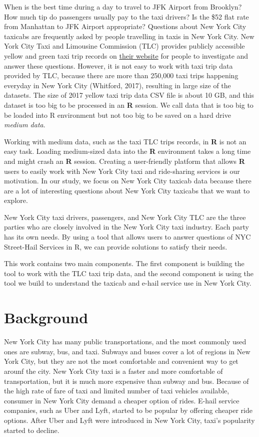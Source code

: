 \documentclass[12pt,twoside]{reedthesis}
\theoremstyle{definition}
\theoremstyle{definition}
\theoremstyle{definition}
\theoremstyle{remark}
\begin{document}
When is the best time during a day to travel to JFK Airport from
Brooklyn? How much tip do passengers usually pay to the taxi drivers? Is
the \$52 flat rate from Manhattan to JFK Airport appropriate? Questions
about New York City taxicabs are frequently asked by people travelling
in taxis in New York City. New York City Taxi and Limousine Commission
(TLC) provides publicly accessible yellow and green taxi trip records on
\href{http://www.nyc.gov/html/tlc/html/about/trip_record_data.shtml}{their
website} for people to investigate and answer these questions. However,
it is not easy to work with taxi trip data provided by TLC, because
there are more than 250,000 taxi trips happening everyday in New York
City (Whitford, 2017), resulting in large size of the datasets. The size
of 2017 yellow taxi trip data CSV file is about 10 GB, and this dataset
is too big to be processed in an \textbf{R} session. We call data that
is too big to be loaded into R environment but not too big to be saved
on a hard drive \emph{medium data}.

Working with medium data, such as the taxi TLC trips records, in
\textbf{R} is not an easy task. Loading medium-sized data into the
\textbf{R} environment takes a long time and might crash an \textbf{R}
session. Creating a user-friendly platform that allows \textbf{R} users
to easily work with New York City taxi and ride-sharing services is our
motivation. In our study, we focus on New York City taxicab data because
there are a lot of interesting questions about New York City taxicabs
that we want to explore.

New York City taxi drivers, passengers, and New York City TLC are the
three parties who are closely involved in the New York City taxi
industry. Each party has its own needs. By using a tool that allows
users to answer questions of NYC Street-Hail Services in R, we can
provide solutions to satisfy their needs.

This work contains two main components. The first component is building
the tool to work with the TLC taxi trip data, and the second component
is using the tool we build to understand the taxicab and e-hail service
use in New York City.

\section{Background}\label{background}

New York City has many public transportations, and the most commonly
used ones are subway, bus, and taxi. Subways and buses cover a lot of
regions in New York City, but they are not the most comfortable and
convenient way to get arounf the city. New York City taxi is a faster
and more comfortable of transportation, but it is much more expensive
than subway and bus. Because of the high rate of fare of taxi and
limited number of taxi vehicles available, consumer in New York City
demand a cheaper option of rides. E-hail service companies, such as Uber
and Lyft, started to be popular by offering cheaper ride options. After
Uber and Lyft were introduced in New York City, taxi's popularity
started to decline.
\end{document}
